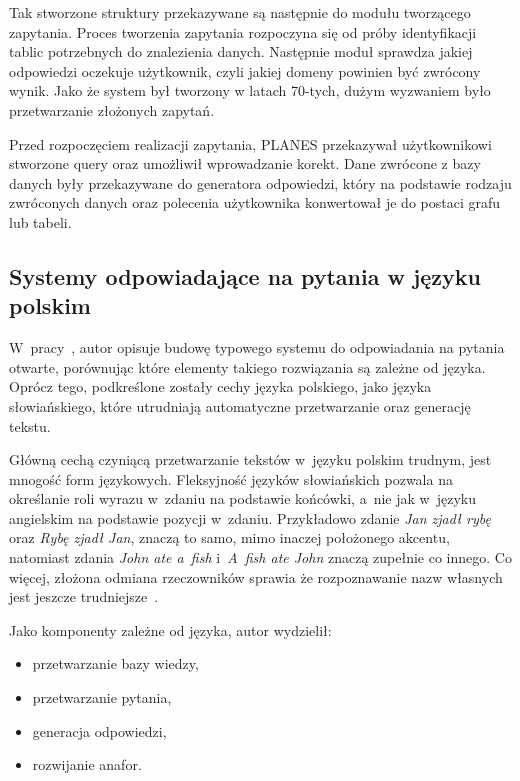 Tak stworzone struktury przekazywane są następnie do modułu tworzącego zapytania. Proces tworzenia zapytania rozpoczyna się od próby identyfikacji tablic potrzebnych do znalezienia danych. Następnie moduł sprawdza jakiej odpowiedzi oczekuje użytkownik, czyli jakiej domeny powinien być zwrócony wynik. Jako że system był tworzony w latach 70-tych, dużym wyzwaniem było przetwarzanie złożonych zapytań.

Przed rozpoczęciem realizacji zapytania, PLANES przekazywał użytkownikowi stworzone query oraz umożliwił wprowadzanie korekt. Dane zwrócone z bazy danych były przekazywane do generatora odpowiedzi, który na podstawie rodzaju zwróconych danych oraz polecenia użytkownika konwertował je do postaci grafu lub tabeli\cite{waltz1978english}.

\subsection{Systemy odpowiadające na pytania w języku polskim}\label{subsec:lit:pl}


W~pracy~\cite{przybyla2012issues}, autor opisuje budowę typowego systemu do odpowiadania na pytania otwarte, porównując które elementy takiego rozwiązania są zależne od języka. Oprócz tego, podkreślone zostały cechy języka polskiego, jako języka słowiańskiego, które utrudniają automatyczne przetwarzanie oraz generację tekstu.

Główną cechą czyniącą przetwarzanie tekstów w~języku polskim trudnym, jest mnogość form językowych. Fleksyjność języków słowiańskich pozwala na określanie roli wyrazu w~zdaniu na podstawie końcówki, a~nie jak w~języku angielskim na podstawie pozycji w~zdaniu. Przykładowo zdanie \emph{Jan zjadł rybę} oraz \emph{Rybę zjadł Jan}, znaczą to samo, mimo inaczej położonego akcentu, natomiast zdania \emph{John ate a~fish} i~\emph{A~fish ate John} znaczą zupełnie co innego. Co więcej, złożona odmiana rzeczowników sprawia że rozpoznawanie nazw własnych jest jeszcze trudniejsze~\cite{przybyla2012issues}.

Jako komponenty zależne od języka, autor wydzielił:
\begin{itemize}
	\item przetwarzanie bazy wiedzy,
	\item przetwarzanie pytania,
	\item generacja odpowiedzi,
	\item rozwijanie anafor.
\end{itemize}

